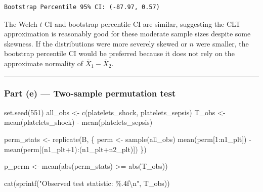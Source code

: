 \documentclass[
  letterpaper,
  DIV=11,
  numbers=noendperiod]{scrartcl}
\newenvironment{Shaded}{\begin{snugshade}}{\end{snugshade}}
\newcommand{\DecValTok}[1]{\textcolor[rgb]{0.68,0.00,0.00}{#1}}
\newcommand{\FunctionTok}[1]{\textcolor[rgb]{0.28,0.35,0.67}{#1}}
\newcommand{\NormalTok}[1]{\textcolor[rgb]{0.00,0.23,0.31}{#1}}
\newcommand{\OtherTok}[1]{\textcolor[rgb]{0.00,0.23,0.31}{#1}}
\newcommand{\SpecialCharTok}[1]{\textcolor[rgb]{0.37,0.37,0.37}{#1}}
\newcommand{\StringTok}[1]{\textcolor[rgb]{0.13,0.47,0.30}{#1}}
\begin{document}
\begin{verbatim}
Bootstrap Percentile 95% CI: (-87.97, 0.57)
\end{verbatim}

The Welch \(t\) CI and bootstrap percentile CI are similar, suggesting
the CLT approximation is reasonably good for these moderate sample sizes
despite some skewness. If the distributions were more severely skewed or
\(n\) were smaller, the bootstrap percentile CI would be preferred
because it does not rely on the approximate normality of
\(\bar{X}_1 - \bar{X}_2\).

\begin{center}\rule{0.5\linewidth}{0.5pt}\end{center}

\subsubsection{Part (e) --- Two-sample permutation
test}\label{part-e-two-sample-permutation-test}

\begin{Shaded}
\begin{Highlighting}[]
\FunctionTok{set.seed}\NormalTok{(}\DecValTok{551}\NormalTok{)}
\NormalTok{all\_obs }\OtherTok{\textless{}{-}} \FunctionTok{c}\NormalTok{(platelets\_shock, platelets\_sepsis)}
\NormalTok{T\_obs   }\OtherTok{\textless{}{-}} \FunctionTok{mean}\NormalTok{(platelets\_shock) }\SpecialCharTok{{-}} \FunctionTok{mean}\NormalTok{(platelets\_sepsis)}

\NormalTok{perm\_stats }\OtherTok{\textless{}{-}} \FunctionTok{replicate}\NormalTok{(B, \{}
\NormalTok{  perm }\OtherTok{\textless{}{-}} \FunctionTok{sample}\NormalTok{(all\_obs)}
  \FunctionTok{mean}\NormalTok{(perm[}\DecValTok{1}\SpecialCharTok{:}\NormalTok{n1\_plt]) }\SpecialCharTok{{-}} \FunctionTok{mean}\NormalTok{(perm[(n1\_plt}\SpecialCharTok{+}\DecValTok{1}\NormalTok{)}\SpecialCharTok{:}\NormalTok{(n1\_plt}\SpecialCharTok{+}\NormalTok{n2\_plt)])}
\NormalTok{\})}

\NormalTok{p\_perm }\OtherTok{\textless{}{-}} \FunctionTok{mean}\NormalTok{(}\FunctionTok{abs}\NormalTok{(perm\_stats) }\SpecialCharTok{\textgreater{}=} \FunctionTok{abs}\NormalTok{(T\_obs))}

\FunctionTok{cat}\NormalTok{(}\FunctionTok{sprintf}\NormalTok{(}\StringTok{"Observed test statistic: \%.4f}\SpecialCharTok{\textbackslash{}n}\StringTok{"}\NormalTok{, T\_obs))}
\end{Highlighting}
\end{Shaded}
\end{document}
